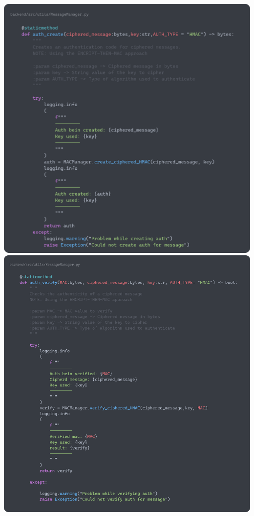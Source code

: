 \documentclass[a4paper,11pt]{article}
\begin{document}
    \includegraphics[width=\textwidth]{images/MM_Auth_Create.png} 
    \includegraphics[width=\textwidth]{images/MM_Auth_Verify.png} 
\end{document}
